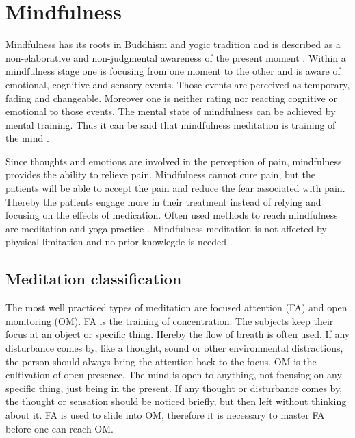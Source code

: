 \section{Mindfulness}
Mindfulness has its roots in Buddhism and yogic tradition and is described as a non-elaborative and non-judgmental awareness of the present moment \cite{Zeidan2016, Kabat1982, Zeidan2012,Tang2017}. Within a mindfulness stage one is focusing from one moment to the other and is aware of emotional, cognitive and sensory events. Those events are perceived as temporary, fading and changeable. Moreover one is neither rating nor reacting cognitive or emotional to those events. The mental state of mindfulness can be achieved by mental training. \cite{Zeidan2016, Zeidan2012}  Thus it can be said that mindfulness meditation is training of the mind \cite{Tang2017}. 

Since thoughts and emotions are involved in the perception of pain, mindfulness provides the ability to relieve pain. Mindfulness cannot cure pain, but the patients will be able to accept the pain and reduce the fear associated with pain. Thereby the patients engage more in their treatment instead of relying and focusing on the effects of medication. \cite{Jacob2016} Often used methods to reach mindfulness are meditation and yoga practice \cite{Kabat1982}.  Mindfulness meditation is not affected by physical limitation and no prior knowlegde is needed \cite{Tang2017}.


\subsection{Meditation classification}
The most well practiced types of meditation are focused attention (FA) and open monitoring (OM). \cite{Zeidan2016} FA is the training of concentration. The subjects keep their focus at an object or specific thing. Hereby the flow of breath is often used.  If any disturbance comes by, like a thought, sound or other environmental distractions, the person should always bring the attention back to the focus. \cite{Zeidan2016} OM is the cultivation of open presence. The mind is open to anything, not focusing on any specific thing, just being in the present. If any thought or disturbance comes by, the thought or sensation should be noticed briefly, but then left without thinking about it. FA is used to slide into OM, therefore it is necessary to master FA before one can reach OM. \cite{Perlman2010, Zeidan2016, Kabat1982} 


